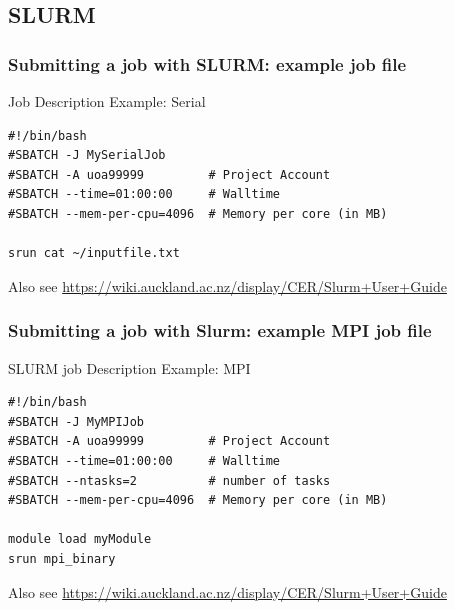 \documentclass{beamer}
\begin{document}
\subsection{SLURM}



\begin{frame}
  \frametitle{Submitting a job with SLURM: example job file}
\begin{block}{Job Description Example: Serial}
\begin{scriptsize}
\begin{verbatim}
#!/bin/bash
#SBATCH -J MySerialJob
#SBATCH -A uoa99999         # Project Account
#SBATCH --time=01:00:00     # Walltime
#SBATCH --mem-per-cpu=4096  # Memory per core (in MB)

srun cat ~/inputfile.txt
\end{verbatim}
\end{scriptsize}
  \end{block}
{\tiny Also see \url{https://wiki.auckland.ac.nz/display/CER/Slurm+User+Guide}}
\end{frame}


\begin{frame}
  \frametitle{Submitting a job with Slurm: example MPI job file}
     \begin{block}{SLURM job Description Example: MPI}
\begin{scriptsize}
\begin{verbatim}
#!/bin/bash
#SBATCH -J MyMPIJob
#SBATCH -A uoa99999         # Project Account
#SBATCH --time=01:00:00     # Walltime
#SBATCH --ntasks=2          # number of tasks
#SBATCH --mem-per-cpu=4096  # Memory per core (in MB)

module load myModule
srun mpi_binary
\end{verbatim}
\end{scriptsize}
  \end{block}
  
{\tiny Also see \url{https://wiki.auckland.ac.nz/display/CER/Slurm+User+Guide}}
\end{frame}
\end{document}
